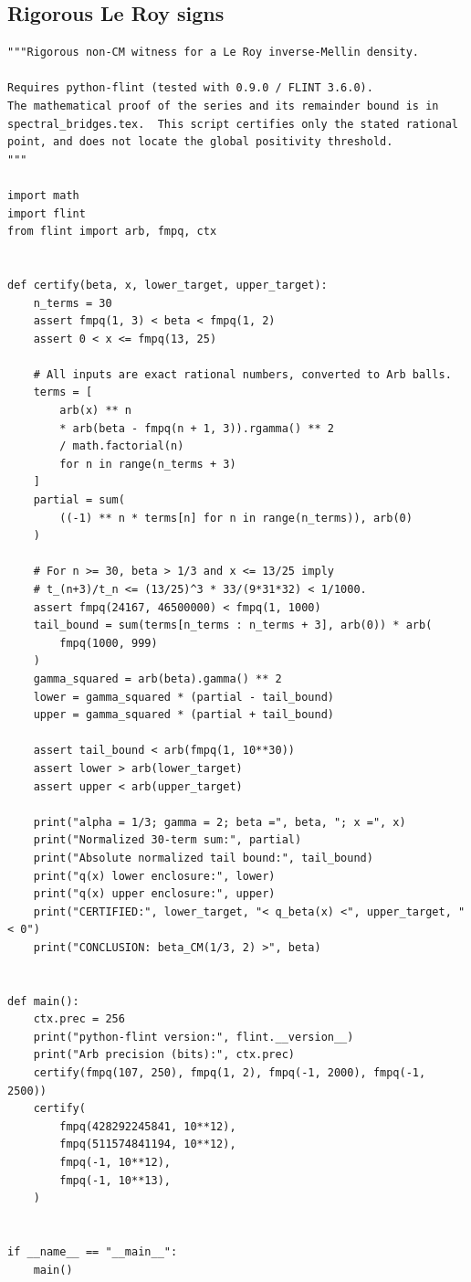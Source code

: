 \documentclass[11pt,a4paper]{article}
\theoremstyle{definition}
\theoremstyle{remark}
\numberwithin{equation}{section}
\begin{document}
\subsection{Rigorous Le Roy signs}
\begin{lstlisting}
"""Rigorous non-CM witness for a Le Roy inverse-Mellin density.

Requires python-flint (tested with 0.9.0 / FLINT 3.6.0).
The mathematical proof of the series and its remainder bound is in
spectral_bridges.tex.  This script certifies only the stated rational
point, and does not locate the global positivity threshold.
"""

import math
import flint
from flint import arb, fmpq, ctx


def certify(beta, x, lower_target, upper_target):
    n_terms = 30
    assert fmpq(1, 3) < beta < fmpq(1, 2)
    assert 0 < x <= fmpq(13, 25)

    # All inputs are exact rational numbers, converted to Arb balls.
    terms = [
        arb(x) ** n
        * arb(beta - fmpq(n + 1, 3)).rgamma() ** 2
        / math.factorial(n)
        for n in range(n_terms + 3)
    ]
    partial = sum(
        ((-1) ** n * terms[n] for n in range(n_terms)), arb(0)
    )

    # For n >= 30, beta > 1/3 and x <= 13/25 imply
    # t_(n+3)/t_n <= (13/25)^3 * 33/(9*31*32) < 1/1000.
    assert fmpq(24167, 46500000) < fmpq(1, 1000)
    tail_bound = sum(terms[n_terms : n_terms + 3], arb(0)) * arb(
        fmpq(1000, 999)
    )
    gamma_squared = arb(beta).gamma() ** 2
    lower = gamma_squared * (partial - tail_bound)
    upper = gamma_squared * (partial + tail_bound)

    assert tail_bound < arb(fmpq(1, 10**30))
    assert lower > arb(lower_target)
    assert upper < arb(upper_target)

    print("alpha = 1/3; gamma = 2; beta =", beta, "; x =", x)
    print("Normalized 30-term sum:", partial)
    print("Absolute normalized tail bound:", tail_bound)
    print("q(x) lower enclosure:", lower)
    print("q(x) upper enclosure:", upper)
    print("CERTIFIED:", lower_target, "< q_beta(x) <", upper_target, "< 0")
    print("CONCLUSION: beta_CM(1/3, 2) >", beta)


def main():
    ctx.prec = 256
    print("python-flint version:", flint.__version__)
    print("Arb precision (bits):", ctx.prec)
    certify(fmpq(107, 250), fmpq(1, 2), fmpq(-1, 2000), fmpq(-1, 2500))
    certify(
        fmpq(428292245841, 10**12),
        fmpq(511574841194, 10**12),
        fmpq(-1, 10**12),
        fmpq(-1, 10**13),
    )


if __name__ == "__main__":
    main()
\end{lstlisting}
\end{document}
